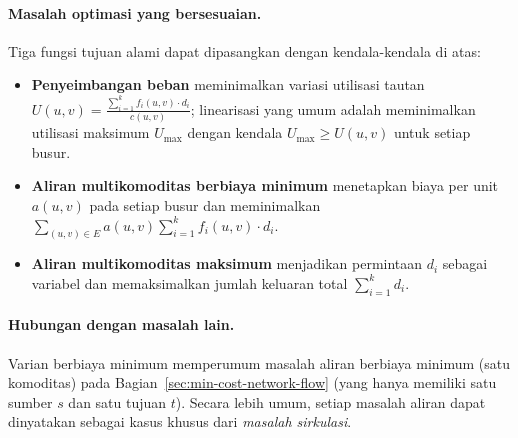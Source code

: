 \paragraph{Masalah optimasi yang bersesuaian.}
Tiga fungsi tujuan alami dapat dipasangkan dengan kendala-kendala di atas:
\begin{itemize}
\item \textbf{Penyeimbangan beban} meminimalkan variasi utilisasi tautan \(U(u,v) = \tfrac{\sum_{i=1}^{k} f_i(u,v) \cdot d_i}{c(u,v)}\); linearisasi yang umum adalah meminimalkan utilisasi maksimum \(U_{\max}\) dengan kendala \(U_{\max} \geq U(u,v)\) untuk setiap busur.
\item \textbf{Aliran multikomoditas berbiaya minimum} menetapkan biaya per unit \(a(u,v)\) pada setiap busur dan meminimalkan \(\sum_{(u,v)\in E} a(u,v) \sum_{i=1}^{k} f_i(u,v) \cdot d_i\).
\item \textbf{Aliran multikomoditas maksimum} menjadikan permintaan \(d_i\) sebagai variabel dan memaksimalkan jumlah keluaran total \(\sum_{i=1}^{k} d_i\).
\end{itemize}

\paragraph{Hubungan dengan masalah lain.}
Varian berbiaya minimum memperumum masalah aliran berbiaya minimum (satu komoditas) pada Bagian~\ref{sec:min-cost-network-flow} (yang hanya memiliki satu sumber \(s\) dan satu tujuan \(t\)). Secara lebih umum, setiap masalah aliran dapat dinyatakan sebagai kasus khusus dari \emph{masalah sirkulasi}.

